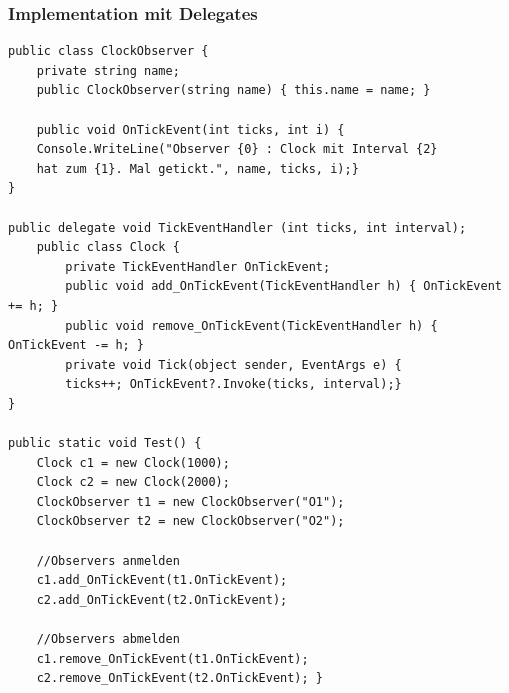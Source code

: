 \subsubsection{Implementation mit Delegates}
\begin{lstlisting}
public class ClockObserver {
    private string name;
    public ClockObserver(string name) { this.name = name; }

    public void OnTickEvent(int ticks, int i) {
    Console.WriteLine("Observer {0} : Clock mit Interval {2}
    hat zum {1}. Mal getickt.", name, ticks, i);}
}

public delegate void TickEventHandler (int ticks, int interval);
    public class Clock {
        private TickEventHandler OnTickEvent;
        public void add_OnTickEvent(TickEventHandler h) { OnTickEvent += h; }
        public void remove_OnTickEvent(TickEventHandler h) { OnTickEvent -= h; }
        private void Tick(object sender, EventArgs e) {
        ticks++; OnTickEvent?.Invoke(ticks, interval);}
}

public static void Test() {
    Clock c1 = new Clock(1000);
    Clock c2 = new Clock(2000);
    ClockObserver t1 = new ClockObserver("O1");
    ClockObserver t2 = new ClockObserver("O2");

    //Observers anmelden
    c1.add_OnTickEvent(t1.OnTickEvent);
    c2.add_OnTickEvent(t2.OnTickEvent);

    //Observers abmelden
    c1.remove_OnTickEvent(t1.OnTickEvent);
    c2.remove_OnTickEvent(t2.OnTickEvent); }
\end{lstlisting}